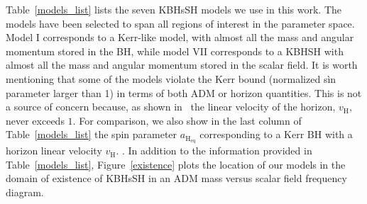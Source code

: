 \documentclass[twocolumn,aps,showpacs,showkeys,prd,superscriptaddress,byrevtex, amsmath]{revtex4-1}
\begin{document}
Table~\ref{models_list} lists the seven KBHsSH models we use in this work. The models have been selected to span all regions of interest in the parameter space. Model I corresponds to a Kerr-like model, with almost all the mass and angular momentum stored in the BH, while model VII corresponds to a KBHSH with almost all the mass and angular momentum stored in the scalar field. It is worth mentioning that some of the models violate the Kerr bound (normalized sìn parameter larger than 1) in terms of both ADM or horizon quantities. This is not a source of concern because, as shown in~\cite{Herdeiro:2015c} the linear velocity of the horizon, $v_{\mathrm{H}}$, never exceeds $1$. For comparison, we also show in the last column of Table~\ref{models_list} the spin parameter $a_{\mathrm{H_{eq}}}$ corresponding to a Kerr BH with a horizon linear velocity $v_{\mathrm{H}}$. . In addition to the information provided in Table~\ref{models_list}, Figure~\ref{existence} plots the location of our models in  the domain of existence of KBHsSH in an ADM mass versus scalar field frequency diagram. 



\end{document}
